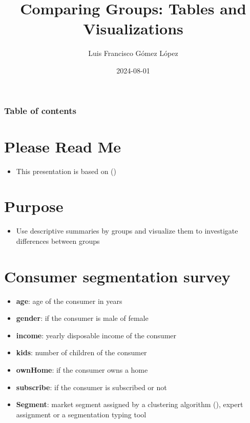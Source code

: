 \documentclass[
  ignorenonframetext,
]{beamer}
\title{Comparing Groups: Tables and Visualizations}
\author{Luis Francisco Gómez López}
\date{2024-08-01}
\institute{FAEDIS}
\providecommand{\tightlist}{%
  \setlength{\itemsep}{0pt}\setlength{\parskip}{0pt}}\usepackage{longtable,booktabs,array}
\renewcommand*\contentsname{Table of contents}
\newcommand\contentsname{Table of contents}
\begin{document}
\frame{\titlepage}

\renewcommand*\contentsname{Table of contents}
\begin{frame}[allowframebreaks]
  \frametitle{Table of contents}
  \tableofcontents[hideallsubsections]
\end{frame}

\section{Please Read Me}\label{please-read-me}

\begin{frame}{}
\label{section}
\begin{itemize}
\tightlist
\item
  This presentation is based on ()
\end{itemize}
\end{frame}

\section{Purpose}\label{purpose}

\begin{frame}{}
\label{section-1}
\begin{itemize}
\tightlist
\item
  Use descriptive summaries by groups and visualize them to investigate
  differences between groups
\end{itemize}
\end{frame}

\section{Consumer segmentation
survey}\label{consumer-segmentation-survey}

\begin{frame}{}
\label{section-2}
\begin{itemize}
\tightlist
\item
  \textbf{age}: age of the consumer in years
\item
  \textbf{gender}: if the consumer is male of female
\item
  \textbf{income}: yearly disposable income of the consumer
\item
  \textbf{kids}: number of children of the consumer
\item
  \textbf{ownHome}: if the consumer owns a home
\item
  \textbf{subscribe}: if the consumer is subscribed or not
\item
  \textbf{Segment}: market segment assigned by a clustering algorithm
  (),
  expert assignment or a segmentation typing tool
\end{itemize}
\end{frame}
\end{document}
